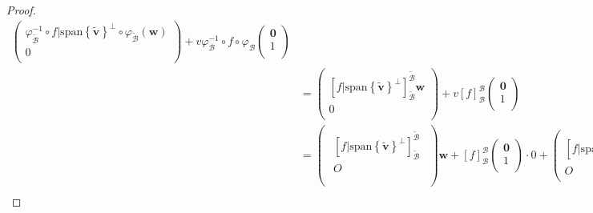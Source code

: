 \documentclass[dvipdfmx]{jsarticle}
\begin{document}
\begin{proof}
\begin{align*}
\begin{pmatrix}
\varphi_{\widetilde{\mathcal{B}}}^{- 1} \circ f|{{\mathrm{span}}\left\{ \widetilde{\mathbf{v}} \right\}}^{\bot} \circ \varphi_{\widetilde{\mathcal{B}}}\left( \mathbf{w} \right) \\
0 \\
\end{pmatrix} + v\varphi_{\mathcal{B}}^{- 1} \circ f \circ \varphi_{\mathcal{B}}\begin{pmatrix}
\mathbf{0} \\
1 \\
\end{pmatrix}\\
&= \begin{pmatrix}
\left[ f|{{\mathrm{span}}\left\{ \widetilde{\mathbf{v}} \right\}}^{\bot} \right]_{\widetilde{\mathcal{B}}}^{\widetilde{\mathcal{B}}}\mathbf{w} \\
0 \\
\end{pmatrix} + v[ f]_{\mathcal{B}}^{\mathcal{B}}\begin{pmatrix}
\mathbf{0} \\
1 \\
\end{pmatrix}\\
&= \begin{pmatrix}
\begin{matrix}
\left[ f|{{\mathrm{span}}\left\{ \widetilde{\mathbf{v}} \right\}}^{\bot} \right]_{\widetilde{\mathcal{B}}}^{\widetilde{\mathcal{B}}} \\
O \\
\end{matrix} \\
\end{pmatrix}\mathbf{w} + [ f]_{\mathcal{B}}^{\mathcal{B}}\begin{pmatrix}
\mathbf{0} \\
1 \\
\end{pmatrix} \cdot 0 + \begin{pmatrix}
\left[ f|{{\mathrm{span}}\left\{ \widetilde{\mathbf{v}} \right\}}^{\bot} \right]_{\widetilde{\mathcal{B}}}^{\widetilde{\mathcal{B}}} \\
O \\
\end{pmatrix}\mathbf{0} + [ f]_{\mathcal{B}}^{\mathcal{B}}\begin{pmatrix}
\mathbf{0} \\
1 \\
\end{pmatrix}v\\

\end{align*}
\end{proof}
\end{document}
